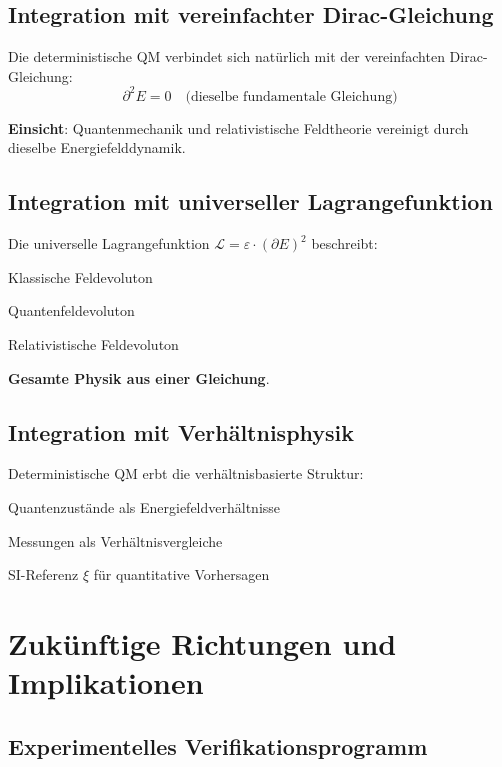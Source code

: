 \documentclass[12pt,a4paper]{article}
\newcommand{\Efield}{E}
\newcommand{\xipar}{\xi}
\begin{document}
			\subsection{Integration mit vereinfachter Dirac-Gleichung}
			
			Die deterministische QM verbindet sich natürlich mit der vereinfachten Dirac-Gleichung:
			\begin{equation}
				\partial^2 \Efield = 0 \quad \text{(dieselbe fundamentale Gleichung)}
			\end{equation}
			
			\textbf{Einsicht}: Quantenmechanik und relativistische Feldtheorie vereinigt durch dieselbe Energiefelddynamik.
			
			\subsection{Integration mit universeller Lagrangefunktion}
			
			Die universelle Lagrangefunktion $\mathcal{L} = \varepsilon \cdot (\partial \Efield)^2$ beschreibt:
			
			Klassische Feldevoluton
			
			Quantenfeldevoluton
			
			Relativistische Feldevoluton
			
			\textbf{Gesamte Physik aus einer Gleichung}.
			
			\subsection{Integration mit Verhältnisphysik}
			
			Deterministische QM erbt die verhältnisbasierte Struktur:
			
			Quantenzustände als Energiefeldverhältnisse
			
			Messungen als Verhältnisvergleiche
			
			SI-Referenz $\xipar$ für quantitative Vorhersagen
			
			\section{Zukünftige Richtungen und Implikationen}
			
			\subsection{Experimentelles Verifikationsprogramm}
			
\end{document}
